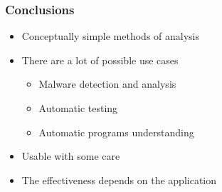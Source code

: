 \newcommand\pro{\item[$v$]}
\newcommand\con{\item[$x$]}

\begin{frame}
	\frametitle{Conclusions}
	\begin{itemize}
		\pro Conceptually simple methods of analysis
		\pro There are a lot of possible use cases
		\begin{itemize}
			\item Malware detection and analysis
			\item Automatic testing
			\item Automatic programs understanding
		\end{itemize}
	\end{itemize}
	\vspace{1cm}
	\begin{itemize}
		\con Usable with some care
		\con The effectiveness depends on the application
	\end{itemize}
\end{frame}
